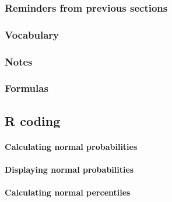 \documentclass[
]{report}
\begin{document}
\hypertarget{reminders-from-previous-sections-4}{%
\subsubsection*{Reminders from previous sections}\label{reminders-from-previous-sections-4}}

\hypertarget{vocabulary-12}{%
\subsubsection*{Vocabulary}\label{vocabulary-12}}

\hypertarget{notes-17}{%
\subsubsection*{Notes}\label{notes-17}}

\hypertarget{formulas}{%
\subsubsection*{Formulas}\label{formulas}}

\hypertarget{r-coding}{%
\subsection*{R coding}\label{r-coding}}

\hypertarget{calculating-normal-probabilities}{%
\paragraph*{Calculating normal probabilities}\label{calculating-normal-probabilities}}

\hypertarget{displaying-normal-probabilities}{%
\paragraph*{Displaying normal probabilities}\label{displaying-normal-probabilities}}

\hypertarget{calculating-normal-percentiles}{%
\paragraph*{Calculating normal percentiles}\label{calculating-normal-percentiles}}
\end{document}
